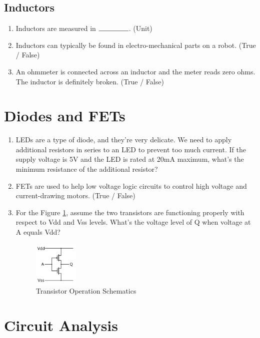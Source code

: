 \documentclass{article}
\newcommand{\ans}{$\rule{1.5cm}{0.15mm}$}
\begin{document}
\subsection{Inductors}
\begin{enumerate}
	\item Inductors are measured in \ans. (Unit)
	\item Inductors can typically be found in electro-mechanical parts on a robot. (True / False)
	\item An ohmmeter is connected across an inductor and the meter reads zero ohms. The inductor is definitely broken. (True / False)
\end{enumerate}

\section{Diodes and FETs}
\begin{enumerate}
	\item LEDs are a type of diode, and they're very delicate. We need to apply additional resistors in series to an LED to prevent too much current. If the supply voltage is 5V and the LED is rated at 20mA maximum, what's the minimum resistance of the additional resistor?
	\item FETs are used to help low voltage logic circuits to control high voltage and current-drawing motors. (True / False)
	\item For the Figure \ref{fig:transistor}, assume the two transistors are functioning properly with respect to Vdd and Vss levels. What's the voltage level of Q when voltage at A equals Vdd?

	\begin{figure}[!h]
		\center
		\includegraphics[width=0.2\textwidth, keepaspectratio]{fetoperation}
		\caption{Transistor Operation Schematics}
		\label{fig:transistor}
	\end{figure}
\end{enumerate}
\clearpage
\section{Circuit Analysis}
\end{document}
